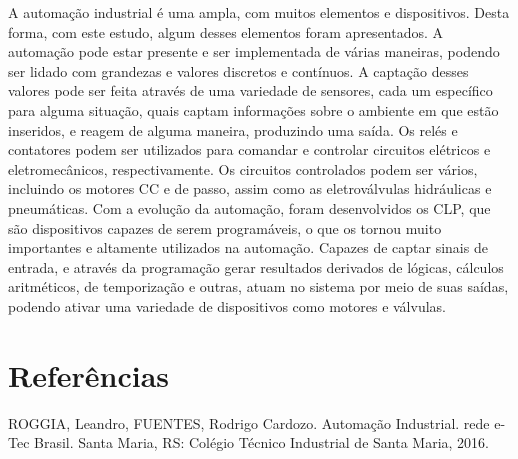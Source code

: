 \documentclass{article}
\begin{document}
A automação industrial é uma ampla, com muitos elementos e dispositivos. Desta forma, com este estudo, algum desses elementos foram apresentados. A automação pode estar presente e ser implementada de várias maneiras, podendo ser lidado com grandezas e valores discretos e contínuos. A captação desses valores pode ser feita através de uma variedade de sensores, cada um específico para alguma situação, quais captam informações sobre o ambiente em que estão inseridos, e reagem de alguma maneira, produzindo uma saída. Os relés e contatores podem ser utilizados para comandar e controlar circuitos elétricos e eletromecânicos, respectivamente. Os circuitos controlados podem ser vários, incluindo os motores CC e de passo, assim como as eletroválvulas hidráulicas e pneumáticas. Com a evolução da automação, foram desenvolvidos os CLP, que são dispositivos capazes de serem programáveis, o que os tornou muito importantes e altamente utilizados na automação. Capazes de captar sinais de entrada, e através da programação gerar resultados derivados de lógicas, cálculos aritméticos, de temporização e outras, atuam no sistema por meio de suas saídas, podendo ativar uma variedade de dispositivos como motores e válvulas.


\section{Referências}

ROGGIA, Leandro, FUENTES, Rodrigo Cardozo. Automação Industrial. rede e-Tec Brasil. Santa Maria, RS: Colégio Técnico Industrial de Santa Maria, 2016. 
\end{document}
